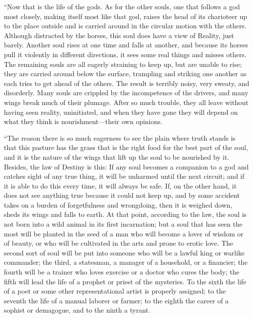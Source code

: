 “Now that is the life of the gods. As for the other
souls, one that follows a god most closely, making itself most like that
god, raises the head of its charioteer up to the place outside and is
carried around in the circular motion with the others. Although
distracted by the horses, this soul does have a view of Reality, just
barely. Another soul rises at one time and falls at another, and because
its horses pull it violently in different directions, it sees some real
things and misses others. The remaining souls are all eagerly straining
to keep up, but are unable to rise; they are carried around below the
surface, trampling and striking one another as each tries to get
ahead of the others. The result is terribly noisy, very sweaty, and
disorderly. Many souls are crippled by the incompetence of the drivers,
and many wings break much of their plumage. After so much trouble, they
all leave without having seen reality, uninitiated, and when they have
gone they will depend on what they think is nourishment---their own
opinions.

“The reason there is so much eagerness to see the plain where truth 
stands is that this pasture has the grass that is the right food
for the best part of the soul, and it is the nature of the wings that
lift up the soul to be nourished by it. Besides, the law of Destiny is
this: If any soul becomes a companion to a god and catches sight of any
true thing, it will be unharmed until the next circuit; and if it is
able to do this every time, it will always be safe. If, on the other
hand, it does not see anything true because it could not keep up, and by
some accident takes on a burden of forgetfulness and wrongdoing, then it
is weighed down, sheds its wings and falls to earth. At that
point, according to the law, the soul is not born into a wild animal in
its first incarnation; but a soul that has seen the most will be planted
in the seed of a man who will become a lover of
wisdom or of beauty,
or who will be cultivated in the arts and prone to erotic love. The
second sort of soul will be put into someone who will be a lawful king
or warlike commander; the third, a statesman, a manager of a household,
or a financier; the fourth will be a trainer who loves exercise or a
doctor who cures the body; the fifth will lead the life of a
prophet or priest of the mysteries. To the sixth the life of a poet or
some other representational artist is properly assigned; to the seventh
the life of a manual laborer or farmer; to the eighth the career of a
sophist or demagogue, and to the ninth a tyrant.

